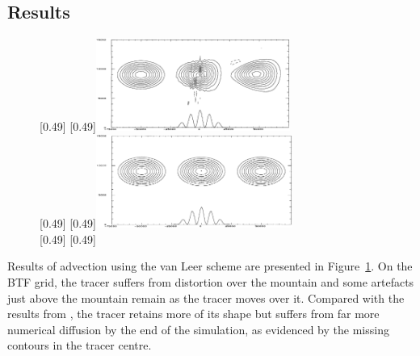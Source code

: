 \subsection{Results}
\begin{figure}
	\captionsetup[subfigure]{position=b}
	\centering
	[0.49\textwidth]{}
	\hfill
	[0.49\textwidth]{\vspace{0.43in}\includegraphics[height=1.2in]{img/schaer-btf-centred.png}}
\\
	[0.49\textwidth]{}
	\hfill
	[0.49\textwidth]{\vspace{0.43in}\includegraphics[height=1.2in]{img/schaer-sleve-centred.png}}
\\
	[0.49\textwidth]{}
	\hfill
	[0.49\textwidth]{}
%
	\caption{}
	\label{fig:advection:vanLeer}
\end{figure}

Results of advection using the van Leer scheme are presented in Figure~\ref{fig:advection:vanLeer}.  On the BTF grid, the tracer suffers from distortion over the mountain and some artefacts just above the mountain remain as the tracer moves over it.  Compared with the results from \textcite{schaer2002}, the tracer retains more of its shape but suffers from far more numerical diffusion by the end of the simulation, as evidenced by the missing contours in the tracer centre.  

